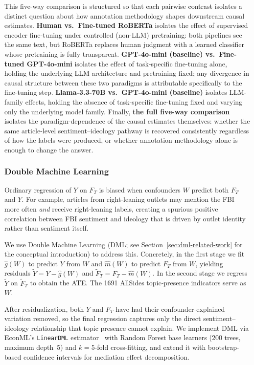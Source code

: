 This five-way comparison is structured so that each pairwise contrast isolates a distinct question about how annotation methodology shapes downstream causal estimates. \textbf{Human vs.\ Fine-tuned RoBERTa} isolates the effect of supervised encoder fine-tuning under controlled (non-LLM) pretraining: both pipelines see the same text, but RoBERTa replaces human judgment with a learned classifier whose pretraining is fully transparent. \textbf{GPT-4o-mini (baseline) vs.\ Fine-tuned GPT-4o-mini} isolates the effect of task-specific fine-tuning alone, holding the underlying LLM architecture and pretraining fixed; any divergence in causal structure between these two paradigms is attributable specifically to the fine-tuning step. \textbf{Llama-3.3-70B vs.\ GPT-4o-mini (baseline)} isolates LLM-family effects, holding the absence of task-specific fine-tuning fixed and varying only the underlying model family. Finally, \textbf{the full five-way comparison} isolates the paradigm-dependence of the causal estimates themselves: whether the same article-level sentiment--ideology pathway is recovered consistently regardless of how the labels were produced, or whether annotation methodology alone is enough to change the answer.

\subsubsection{Double Machine Learning}
\label{sec:dml}

Ordinary regression of $Y$ on $F_T$ is biased when confounders $W$ predict both $F_T$ and $Y$. For example, articles from right-leaning outlets may mention the FBI more often \emph{and} receive right-leaning labels, creating a spurious positive correlation between FBI sentiment and ideology that is driven by outlet identity rather than sentiment itself.

We use Double Machine Learning (DML; see Section~\ref{sec:dml-related-work} for the conceptual introduction) to address this. Concretely, in the first stage we fit $\hat{g}(W)$ to predict $Y$ from $W$ and $\hat{m}(W)$ to predict $F_T$ from $W$, yielding residuals $\tilde{Y} = Y - \hat{g}(W)$ and $\tilde{F}_T = F_T - \hat{m}(W)$. In the second stage we regress $\tilde{Y}$ on $\tilde{F}_T$ to obtain the ATE. The 1691 AllSides topic-presence indicators serve as $W$.

After residualization, both $Y$ and $F_T$ have had their confounder-explained variation removed, so the final regression captures only the direct sentiment--ideology relationship that topic presence cannot explain. We implement DML via EconML's \texttt{LinearDML} estimator~\citep{econml} with Random Forest base learners (\num{200} trees, maximum depth~5) and $k = 5$-fold cross-fitting, and extend it with bootstrap-based confidence intervals for mediation effect decomposition.

